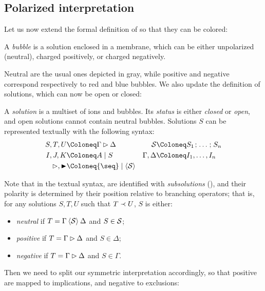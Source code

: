 \subsection{Polarized interpretation}

Let us now extend the formal definition of  so that they can be colored:

\begin{definition}[Bubble]
  A \emph{bubble} is a solution enclosed in a membrane, which can be either
  unpolarized (neutral), charged positively, or charged negatively.
\end{definition}

Neutral  are the usual ones depicted in gray, while positive and negative
 correspond respectively to red and blue bubbles. We also update the
definition of solutions, which can now be open or closed:

\begin{definition}[Solution]
  
  A \emph{solution} is a multiset of ions and bubbles. Its \emph{status} is
  either \emph{closed} or \emph{open}, and open solutions cannot contain neutral
  bubbles. Solutions $S$ can be represented textually with the following syntax:
  \begin{align*}
    S, T, U &\Coloneq \Gamma \J \Delta &
    \cS &\Coloneq S_1 \sep \ldots \sep S_n \\
    I, J, K &\Coloneq A \mid S &
    \Gamma, \Delta &\Coloneq I_1, \ldots, I_n \\
    \J, \JB &\Coloneq {\seq} \mid {\piq{\cS}} &&
  \end{align*}
\end{definition}

Note that in the textual syntax,  are identified with \emph{subsolutions}
(), and their polarity is determined by their position
relative to branching operators; that is, for any solutions $S, T, U$ such that
$T \prec U$, $S$ is either:
\begin{itemize}
  \item \emph{neutral} if $T = \Gamma \mathbin{\langle \mathcal{S} \rangle} \Delta$ and $S \in
  \mathcal{S}$;
  \item \emph{positive} if $T = \Gamma \mathbin{\rhd} \Delta$ and $S \in \Delta$;
  \item \emph{negative} if $T = \Gamma \mathbin{\rhd} \Delta$ and $S \in \Gamma$.
\end{itemize}

Then we need to split our symmetric interpretation accordingly, so that positive
 are mapped to implications, and negative  to
exclusions:

